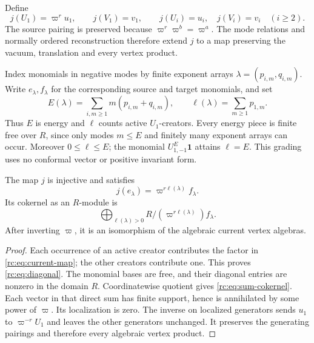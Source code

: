 Define
\begin{equation}\label{rc:eq:current-map}
 j(U_1)=\varpi^r u_1,\qquad j(V_1)=v_1,\qquad
 j(U_i)=u_i,\quad j(V_i)=v_i\quad(i\geq2).
\end{equation}
The source pairing is preserved because
\(\varpi^r\varpi^b=\varpi^a\).  The mode relations and
normally ordered reconstruction therefore extend \(j\) to a map
preserving the vacuum, translation and every vertex product.

Index monomials in negative modes by finite exponent arrays
\(\lambda=(p_{i,m},q_{i,m})\).  Write \(e_\lambda,f_\lambda\)
for the corresponding source and target monomials, and set
\begin{equation}\label{rc:eq:energy}
 E(\lambda)=\sum_{i,m\geq1}m(p_{i,m}+q_{i,m}),\qquad
 \ell(\lambda)=\sum_{m\geq1}p_{1,m}.
\end{equation}
Thus \(E\) is energy and \(\ell\) counts active \(U_1\)-creators.
Every energy piece is finite free over \(R\), since only modes
\(m\leq E\) and finitely many exponent arrays can occur.  Moreover
\(0\leq\ell\leq E\); the monomial \(U_{1,-1}^E\mathbf1\)
attains \(\ell=E\).  This grading uses no conformal vector or
positive invariant form.

\begin{proposition}\label{rc:prop:diagonal}
The map \(j\) is injective and satisfies
\begin{equation}\label{rc:eq:diagonal}
 j(e_\lambda)=\varpi^{r\ell(\lambda)}f_\lambda.
\end{equation}
Its cokernel as an \(R\)-module is
\begin{equation}\label{rc:eq:sum-cokernel}
 \bigoplus_{\ell(\lambda)>0}
       R/(\varpi^{r\ell(\lambda)})f_\lambda.
\end{equation}
After inverting \(\varpi\), it is an isomorphism of the algebraic
current vertex algebras.
\end{proposition}
\begin{proof}
Each occurrence of an active creator contributes the factor in
\eqref{rc:eq:current-map}; the other creators contribute one.
This proves \eqref{rc:eq:diagonal}.  The monomial bases are free,
and their diagonal entries are nonzero in the domain \(R\).
Coordinatewise quotient gives \eqref{rc:eq:sum-cokernel}.
Each vector in that direct sum has finite support, hence is
annihilated by some power of \(\varpi\).  Its localization is zero.
The inverse on localized generators sends \(u_1\) to
\(\varpi^{-r}U_1\) and leaves the other generators unchanged.
It preserves the generating pairings and therefore every
algebraic vertex product.
\end{proof}

